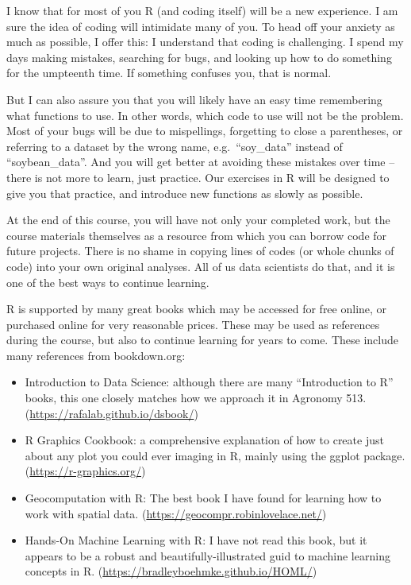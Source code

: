 \documentclass[
]{book}
\providecommand{\tightlist}{%
  \setlength{\itemsep}{0pt}\setlength{\parskip}{0pt}}
\begin{document}
I know that for most of you R (and coding itself) will be a new experience. I am sure the idea of coding will intimidate many of you. To head off your anxiety as much as possible, I offer this: I understand that coding is challenging. I spend my days making mistakes, searching for bugs, and looking up how to do something for the umpteenth time. If something confuses you, that is normal.

But I can also assure you that you will likely have an easy time remembering what functions to use. In other words, which code to use will not be the problem. Most of your bugs will be due to mispellings, forgetting to close a parentheses, or referring to a dataset by the wrong name, e.g.~``soy\_data'' instead of ``soybean\_data''. And you will get better at avoiding these mistakes over time -- there is not more to learn, just practice. Our exercises in R will be designed to give you that practice, and introduce new functions as slowly as possible.

At the end of this course, you will have not only your completed work, but the course materials themselves as a resource from which you can borrow code for future projects. There is no shame in copying lines of codes (or whole chunks of code) into your own original analyses. All of us data scientists do that, and it is one of the best ways to continue learning.

R is supported by many great books which may be accessed for free online, or purchased online for very reasonable prices. These may be used as references during the course, but also to continue learning for years to come. These include many references from bookdown.org:

\begin{itemize}
\tightlist
\item
  Introduction to Data Science: although there are many ``Introduction to R'' books, this one closely matches how we approach it in Agronomy 513. (\url{https://rafalab.github.io/dsbook/})
\item
  R Graphics Cookbook: a comprehensive explanation of how to create just about any plot you could ever imaging in R, mainly using the ggplot package. (\url{https://r-graphics.org/})
\item
  Geocomputation with R: The best book I have found for learning how to work with spatial data. (\url{https://geocompr.robinlovelace.net/})
\item
  Hands-On Machine Learning with R: I have not read this book, but it appears to be a robust and beautifully-illustrated guid to machine learning concepts in R. (\url{https://bradleyboehmke.github.io/HOML/})
\end{itemize}
\end{document}
